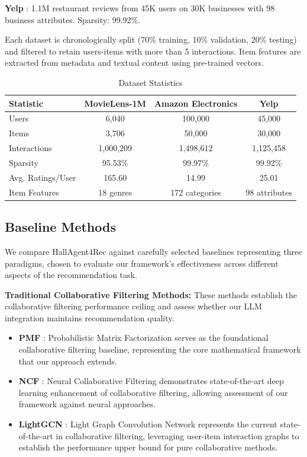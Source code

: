 \documentclass[acmsmall]{acmart}
\begin{document}
\textbf{Yelp} \cite{yelp2025}: 1.1M restaurant reviews from 45K users on 30K businesses with 98 business attributes. Sparsity: 99.92\%.

Each dataset is chronologically split (70\% training, 10\% validation, 20\% testing) and filtered to retain users-items with more than 5 interactions. Item features are extracted from metadata and textual content using pre-trained vectors.

\begin{table}[h]
\centering
\caption{Dataset Statistics}
\label{tab:dataset-statistics}
\small
\begin{tabular}{lccc}
\toprule
\textbf{Statistic} & \textbf{MovieLens-1M} & \textbf{Amazon Electronics} & \textbf{Yelp} \\
\midrule
Users & 6,040 & 100,000 & 45,000 \\
Items & 3,706 & 50,000 & 30,000 \\
Interactions & 1,000,209 & 1,498,612 & 1,125,458 \\
Sparsity & 95.53\% & 99.97\% & 99.92\% \\
Avg. Ratings/User & 165.60 & 14.99 & 25.01 \\
Item Features & 18 genres & 172 categories & 98 attributes \\
\bottomrule
\end{tabular}
\end{table}

\subsection{Baseline Methods}
We compare HallAgent4Rec against carefully selected baselines representing three paradigms, chosen to evaluate our framework's effectiveness across different aspects of the recommendation task.

\textbf{Traditional Collaborative Filtering Methods:}
These methods establish the collaborative filtering performance ceiling and assess whether our LLM integration maintains recommendation quality.

\begin{itemize}
\item \textbf{PMF} \cite{mnih2007probabilistic}: Probabilistic Matrix Factorization serves as the foundational collaborative filtering baseline, representing the core mathematical framework that our approach extends.
\item \textbf{NCF} \cite{he2017neural}: Neural Collaborative Filtering demonstrates state-of-the-art deep learning enhancement of collaborative filtering, allowing assessment of our framework against neural approaches.
\item \textbf{LightGCN} \cite{he2020lightgcn}: Light Graph Convolution Network represents the current state-of-the-art in collaborative filtering, leveraging user-item interaction graphs to establish the performance upper bound for pure collaborative methods.
\end{itemize}
\end{document}
